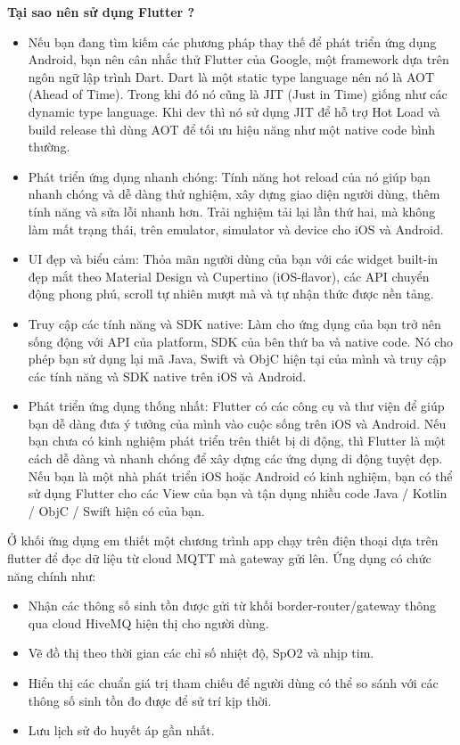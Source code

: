 \documentclass{report}
\begin{document}
\noindent
\textbf{Tại sao nên sử dụng Flutter ?}
\begin{itemize}
	\item Nếu bạn đang tìm kiếm các phương pháp thay thế để phát triển ứng dụng Android, bạn nên cân nhắc thử Flutter của Google, một framework dựa trên ngôn ngữ lập trình Dart. Dart là một static type language nên nó là AOT (Ahead of Time). Trong khi đó nó cũng là JIT (Just in Time) giống như các dynamic type language. Khi dev thì nó sử dụng JIT để hỗ trợ Hot Load và build release thì dùng AOT để tối ưu hiệu năng như một native code bình thường.
	\item Phát triển ứng dụng nhanh chóng: Tính năng hot reload của nó giúp bạn nhanh chóng và dễ dàng thử nghiệm, xây dựng giao diện người dùng, thêm tính năng và sửa lỗi nhanh hơn. Trải nghiệm tải lại lần thứ hai, mà không làm mất trạng thái, trên emulator, simulator và device cho iOS và Android.
	\item UI đẹp và biểu cảm: Thỏa mãn người dùng của bạn với các widget built-in đẹp mắt theo Material Design và Cupertino (iOS-flavor), các API chuyển động phong phú, scroll tự nhiên mượt mà và tự nhận thức được nền tảng.
	\item Truy cập các tính năng và SDK native: Làm cho ứng dụng của bạn trở nên sống động với API của platform, SDK của bên thứ ba và native code. Nó cho phép bạn sử dụng lại mã Java, Swift và ObjC hiện tại của mình và truy cập các tính năng và SDK native trên iOS và Android.
	\item Phát triển ứng dụng thống nhất: Flutter có các công cụ và thư viện để giúp bạn dễ dàng đưa ý tưởng của mình vào cuộc sống trên iOS và Android. Nếu bạn chưa có kinh nghiệm phát triển trên thiết bị di động, thì Flutter là một cách dễ dàng và nhanh chóng để xây dựng các ứng dụng di động tuyệt đẹp. Nếu bạn là một nhà phát triển iOS hoặc Android có kinh nghiệm, bạn có thể sử dụng Flutter cho các View của bạn và tận dụng nhiều code Java / Kotlin / ObjC / Swift hiện có của bạn.
\end{itemize}

Ở khối ứng dụng em thiết một chương trình app chạy trên điện thoại dựa trên flutter để đọc dữ liệu từ cloud MQTT mà gateway gửi lên. Ứng dụng có chức năng chính như:
\begin{itemize}
	\item Nhận các thông số sinh tồn được gửi từ khối border-router/gateway thông qua cloud HiveMQ hiện thị cho người dùng.
	\item Vẽ đồ thị theo thời gian các chỉ số nhiệt độ, SpO2 và nhịp tim.
	\item Hiển thị các chuẩn giá trị tham chiếu để người dùng có thể so sánh với các thông số sinh tồn đo được để sử trí kịp thời. 
	\item Lưu lịch sử đo huyết áp gần nhất.
\end{itemize}
\end{document}
